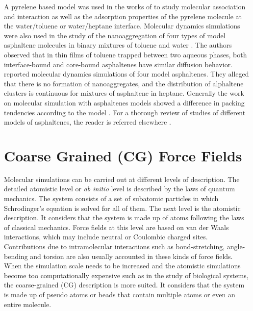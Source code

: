 A pyrelene based model was used in the works of  to study molecular association and interaction as well as the adsorption properties of the pyrelene molecule at the water/toluene or water/heptane interface. Molecular dynamics simulations were also used in the study of the nanoaggregation of four types of model asphaltene molecules in binary mixtures of toluene and water \cite{doi:10.1021/ef9004576}. The authors  observed that  in thin films of toluene trapped between two aqueous phases,
both interface-bound and core-bound asphaltenes have similar diffusion behavior.  reported molecular dynamics simulations of four model asphaltenes. They alleged that there is no formation of nanoaggregates, and the distribution of alphaltene clusters is continuous for mixtures of asphaltene in heptane. Generally the work on molecular simulation with asphaltenes models showed a difference in
packing tendencies according to the model \cite{doi:10.1080/10298436.2011.575141}. For a thorough review of studies of different models of asphaltenes, the reader is referred elsewhere \cite{doi:10.1080/10298436.2011.575141}. 


\section{Coarse Grained (CG) Force Fields}


Molecular simulations can be carried out at different levels of description. The detailed atomistic level or \textit{ab initio} level is described by the laws of quantum mechanics. The system consists of a set of subatomic particles in which Schrodinger's equation is solved for all of them. The next level is the atomistic description. It considers that the system is made up of atoms following the laws of classical mechanics.  Force fields at this level are based on van der Waals interactions, which may include neutral or Coulombic charged sites. Contributions due to intramolecular interactions such as bond-stretching, angle-bending and torsion are also usually accounted in these kinds of force fields. When the simulation scale needs to be increased and the atomistic simulations become too computationally expensive such as in the study of biological systems, the coarse-grained (CG) description is more suited. It considers that the system is made up of pseudo atoms or beads that contain multiple atoms or even an entire molecule. 


